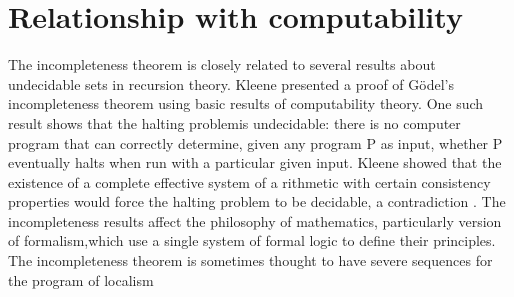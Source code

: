 \documentclass{article}
\begin{document}
\section{Relationship with computability}
The incompleteness theorem is closely related to several results about undecidable 
sets in recursion theory.
Kleene presented a proof of Gödel's incompleteness theorem using basic results of 
computability theory. One such result shows that the halting problemis undecidable: 
there is no computer program that can correctly determine, given any program P as 
input, whether P eventually halts when run with a particular given input. Kleene 
showed that the existence of a complete effective system of a rithmetic with certain 
consistency properties would force the halting problem to be decidable, a contradiction
.
The incompleteness results affect the philosophy of mathematics, particularly version 
of formalism,which use a single system of formal logic to define their principles. The
incompleteness theorem is sometimes thought to have severe sequences for the 
program of localism
\end{document}
